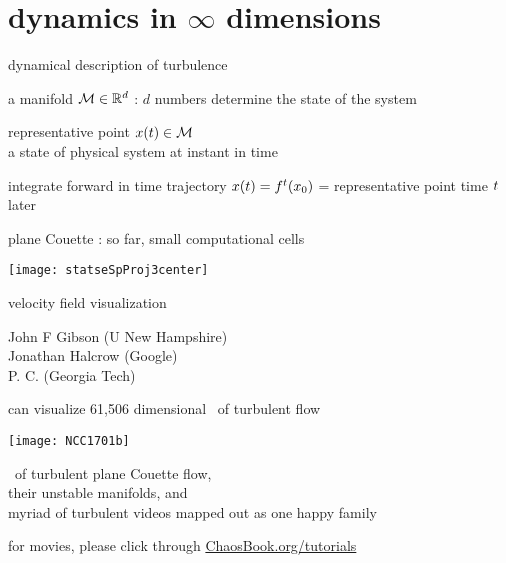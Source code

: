 \section[dynamics in $\infty$ dimensions]
{dynamics in $\infty$ dimensions}

\begin{frame}{dynamical description of turbulence}

\begin{block}{\statesp}
a manifold $\mathcal{M} \in \mathbb{R}^{d}$ :
$d$ numbers determine the state of the system
\end{block}

\bigskip

\begin{block}{representative point }
$x(t) \in \mathcal{M}$
\\
a state of physical system at instant in time
\end{block}

\bigskip

\begin{block}{\color{red}integrate forward in time}
trajectory $x(t) = {f^{t}({x_0})}$ =
representative point time $t$ later
\end{block}
\end{frame}


\begin{frame}{plane Couette : so far, {\Huge small} computational cells
}
\begin{center}
\texttt{[image: statseSpProj3center]}
\end{center}
velocity field visualization
\vfill

{\scriptsize
John F Gibson (U New Hampshire)
\\
Jonathan Halcrow (Google)
\\
P. C. (Georgia Tech)
}
\end{frame}

\begin{frame}{can visualize 61,506 dimensional \statesp\ of turbulent flow}
\begin{center}
\texttt{[image: NCC1701b]}
\end{center}
\eqva\ of turbulent plane Couette flow,
\\
their unstable manifolds, and
\\
myriad of turbulent videos mapped out as one happy family

\bigskip

\hfill   {\small
          for movies, please click through
            \textcolor{blue}{\href{http://ChaosBook.org/tutorials}
             {ChaosBook.org/tutorials}}
          }
\end{frame}

